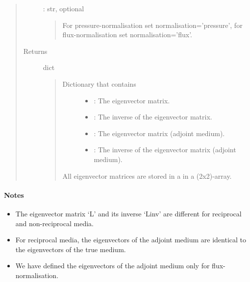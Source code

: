 \documentclass[letterpaper,10pt,english]{sphinxmanual}
\begin{document}
\begin{fulllineitems}
\begin{fulllineitems}
\begin{quote}
\begin{description}
 : str, optional
\begin{quote}

For pressure-normalisation set normalisation=’pressure’, for flux-normalisation set normalisation=’flux’.
\end{quote}

\item[{Returns}] \leavevmode
dict
\begin{quote}
\begin{description}
\item[{Dictionary that contains }] \leavevmode\begin{itemize}
\item {} 
: The eigenvector matrix.

\item {} 
: The inverse of the eigenvector matrix.

\item {} 
: The eigenvector matrix (adjoint medium).

\item {} 
: The inverse of the eigenvector matrix (adjoint medium).

\end{itemize}

\end{description}

All eigenvector matrices are stored in a in a (2x2)-array.
\end{quote}

\end{description}\end{quote}
\paragraph{Notes}
\begin{itemize}
\item {} 
The eigenvector matrix ‘L’ and its inverse ‘Linv’ are different for reciprocal and non-reciprocal media.

\item {} 
For reciprocal media, the eigenvectors of the adjoint medium are identical to the eigenvectors of the true medium.

\item {} 
We have defined the eigenvectors of the adjoint medium only for flux-normalisation.

\end{itemize}

\end{fulllineitems}
\end{fulllineitems}
\end{document}

